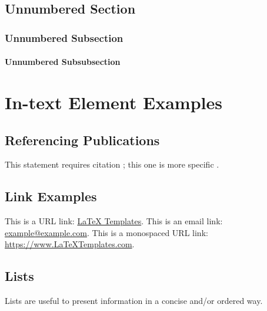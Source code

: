 \documentclass[
	11pt, %
	fleqn, %
	a4paper, %
]{LegrandOrangeBook}
\begin{document}

\section*{Unnumbered Section}

\subsection*{Unnumbered Subsection}

\subsubsection*{Unnumbered Subsubsection}




\chapter{In-text Element Examples}



\section{Referencing Publications}
This statement requires citation \cite{Smith:2022jd}; this one is more specific \cite[162]{Smith:2021qr}.




\section{Link Examples}

This is a URL link: \href{https://www.latextemplates.com}{LaTeX Templates}.
This is an email link: \href{mailto:example@example.com}{example@example.com}.
This is a monospaced URL link: \url{https://www.LaTeXTemplates.com}.




\section{Lists}
Lists are useful to present information in a concise and/or ordered way.
\end{document}
